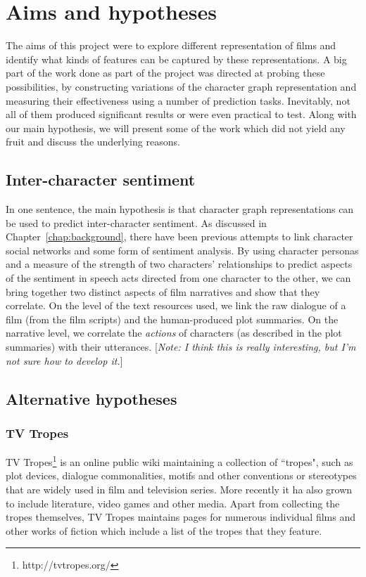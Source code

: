 \documentclass[bsc,frontabs,singlespacing,parskip]{infthesis} %
\begin{document}
\chapter{Aims and hypotheses}

The aims of this project were to explore different representation of films and identify what kinds of features can be captured by these representations. A big part of the work done as part of the project was directed at probing these possibilities, by constructing variations of the character graph representation and measuring their effectiveness using a number of prediction tasks. Inevitably, not all of them produced significant results or were even practical to test. Along with our main hypothesis, we will present some of the work which did not yield any fruit and discuss the underlying reasons.

\section{Inter-character sentiment}
In one sentence, the main hypothesis is that character graph representations can be used to predict inter-character sentiment. As discussed in Chapter~\ref{chap:background}, there have been previous attempts to link character social networks and some form of sentiment analysis. By using character personas and a measure of the strength of two characters' relationships to predict aspects of the sentiment in speech acts directed from one character to the other, we can bring together two distinct aspects of film narratives and show that they correlate. On the level of the text resources used, we link the raw dialogue of a film (from the film scripts) and the human-produced plot summaries. On the narrative level, we correlate the \textit{actions} of characters (as described in the plot summaries) with their utterances. [\textit{Note: I think this is really interesting, but I'm not sure how to develop it.}]

\section{Alternative hypotheses}

\subsection{TV Tropes}
TV Tropes\footnote{http://tvtropes.org/} is an online public wiki maintaining a collection of ``tropes", such as plot devices, dialogue commonalities, motifs and other conventions or stereotypes that are widely used in film and television series. More recently it ha also grown to include literature, video games and other media. Apart from collecting the tropes themselves, TV Tropes maintains pages for numerous individual films and other works of fiction which include a list of the tropes that they feature.
\end{document}
